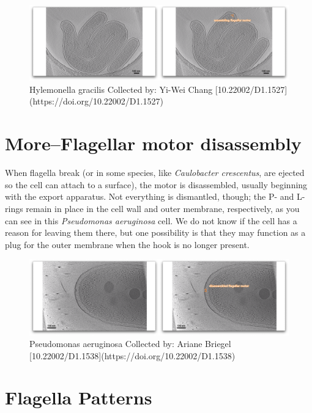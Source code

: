 \documentclass[]{tufte-book}
\begin{document}
\begin{figure}
\includegraphics{movie_stills/6_3} \caption[Hylemonella gracilis Collected by]{Hylemonella gracilis Collected by: Yi-Wei Chang [10.22002/D1.1527](https://doi.org/10.22002/D1.1527)}\label{fig:unnamed-chunk-104}
\end{figure}

\hypertarget{moreflagellar-motor-disassembly}{\section{More--Flagellar
motor disassembly}\label{moreflagellar-motor-disassembly}}

When flagella break (or in some species, like \emph{Caulobacter
crescentus}, are ejected so the cell can attach to a surface), the motor
is disassembled, usually beginning with the export apparatus. Not
everything is dismantled, though; the P- and L-rings remain in place in
the cell wall and outer membrane, respectively, as you can see in this
\emph{Pseudomonas aeruginosa} cell. We do not know if the cell has a
reason for leaving them there, but one possibility is that they may
function as a plug for the outer membrane when the hook is no longer
present.

\begin{figure}
\includegraphics{movie_stills/6_3a} \caption[Pseudomonas aeruginosa Collected by]{Pseudomonas aeruginosa Collected by: Ariane Briegel [10.22002/D1.1538](https://doi.org/10.22002/D1.1538)}\label{fig:unnamed-chunk-105}
\end{figure}

\section{Flagella Patterns}\label{flagella-patterns}
\end{document}
